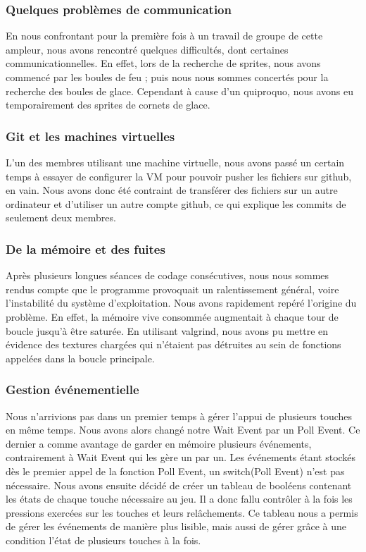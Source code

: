 	\subsubsection{Quelques problèmes de communication}
 
En nous confrontant pour la première fois à un travail de groupe de cette ampleur, nous avons rencontré quelques difficultés, dont certaines communicationnelles. En effet, lors de la recherche de sprites, nous avons commencé par les boules de feu ; puis nous nous sommes concertés pour la recherche des boules de glace. Cependant à cause d'un quiproquo, nous avons eu temporairement des sprites de cornets de glace.

	\subsubsection{Git et les machines virtuelles}
	L'un des membres utilisant une machine virtuelle, nous avons passé un certain temps à essayer de configurer la VM pour pouvoir pusher les fichiers sur github, en vain. Nous avons donc été contraint de transférer des fichiers sur un autre ordinateur et d'utiliser un autre compte github, ce qui explique les commits de seulement deux membres.

	\subsubsection{De la mémoire et des fuites}

Après plusieurs longues séances de codage consécutives, nous nous sommes rendus compte que le programme provoquait un ralentissement général, voire l'instabilité du système d'exploitation. Nous avons rapidement repéré l'origine du problème. En effet, la mémoire vive consommée augmentait à chaque tour de boucle jusqu'à être saturée. En utilisant valgrind, nous avons pu mettre en évidence des textures chargées qui n'étaient pas détruites au sein de fonctions appelées dans la boucle principale.

	\subsubsection{Gestion événementielle}
	
	Nous n'arrivions pas dans un premier temps à gérer l'appui de plusieurs touches en même temps. Nous avons alors changé notre Wait Event par un Poll Event. Ce dernier a comme avantage de garder en mémoire plusieurs événements, contrairement à Wait Event qui les gère un par un. Les événements étant stockés dès le premier appel de la fonction Poll Event, un switch(Poll Event) n'est pas nécessaire. Nous avons ensuite décidé de créer un tableau de booléens contenant les états de chaque touche nécessaire au jeu. Il a donc fallu contrôler à la fois les pressions exercées sur les touches et leurs relâchements. Ce tableau nous a permis de gérer les événements de manière plus lisible, mais aussi de gérer grâce à une condition l'état de plusieurs touches à la fois. 

